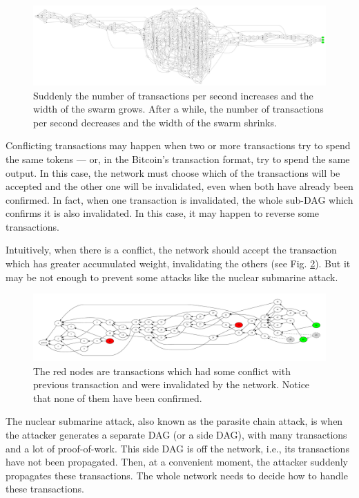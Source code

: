\begin{figure}[ht]
\centering\includegraphics[width=\textwidth]{./images01/fig-tangle-swarm.pdf}
\caption{Suddenly the number of transactions per second increases and the width of the swarm grows. After a while, the number of transactions per second decreases and the width of the swarm shrinks.\label{fig-tangle-swarm}}
\end{figure}

Conflicting transactions may happen when two or more transactions try to spend the same tokens --- or, in the Bitcoin's transaction format, try to spend the same output. In this case, the network must choose which of the transactions will be accepted and the other one will be invalidated, even when both have already been confirmed. In fact, when one transaction is invalidated, the whole sub-DAG which confirms it is also invalidated. In this case, it may happen to reverse some transactions.

Intuitively, when there is a conflict, the network should accept the transaction which has greater accumulated weight, invalidating the others (see Fig. \ref{fig-tangle-conflict}). But it may be not enough to prevent some attacks like the nuclear submarine attack.

\begin{figure}[ht]
\centering\includegraphics[width=\textwidth]{./images01/fig-tangle-conflict.pdf}
\caption{The red nodes are transactions which had some conflict with previous transaction and were invalidated by the network. Notice that none of them have been confirmed.\label{fig-tangle-conflict}}
\end{figure}

The nuclear submarine attack, also known as the parasite chain attack, is when the attacker generates a separate DAG (or a side DAG), with many transactions and a lot of proof-of-work. This side DAG is off the network, i.e., its transactions have not been propagated. Then, at a convenient moment, the attacker suddenly propagates these transactions. The whole network needs to decide how to handle these transactions.

